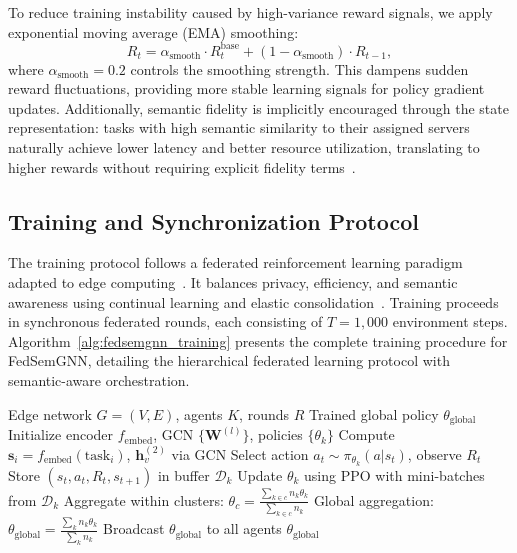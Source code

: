 \documentclass[conference]{IEEEtran}
\begin{document}
		To reduce training instability caused by high-variance reward signals, we apply exponential moving average (EMA) smoothing:
		\begin{equation}
			R_t = \alpha_{\text{smooth}} \cdot R_t^{\text{base}} + (1 - \alpha_{\text{smooth}}) \cdot R_{t-1},
			\label{eq:smoothed_reward}
		\end{equation}
		where $\alpha_{\text{smooth}} = 0.2$ controls the smoothing strength. This dampens sudden reward fluctuations, providing more stable learning signals for policy gradient updates. Additionally, semantic fidelity is implicitly encouraged through the state representation: tasks with high semantic similarity to their assigned servers naturally achieve lower latency and better resource utilization, translating to higher rewards without requiring explicit fidelity terms~\cite{ji2024resource}.
		
		\subsection{Training and Synchronization Protocol}
		
		The training protocol follows a federated reinforcement learning paradigm adapted to edge computing~\cite{grasso2022hhome, zhou2024qos}. It balances privacy, efficiency, and semantic awareness using continual learning and elastic consolidation~\cite{zhou2024robustfl}. Training proceeds in synchronous federated rounds, each consisting of $T = 1{,}000$ environment steps. Algorithm~\ref{alg:fedsemgnn_training} presents the complete training procedure for FedSemGNN, detailing the hierarchical federated learning protocol with semantic-aware orchestration.
		
		\begin{algorithm}[t]
			\caption{FedSemGNN Training Protocol}
			\label{alg:fedsemgnn_training}
			\begin{algorithmic}[1]
				\REQUIRE Edge network $G=(V,E)$, agents $K$, rounds $R$
				\ENSURE Trained global policy $\theta_{\text{global}}$
				\STATE Initialize encoder $f_{\text{embed}}$, GCN $\{\mathbf{W}^{(l)}\}$, policies $\{\theta_k\}$
				\STATE Compute $\mathbf{s}_i = f_{\text{embed}}(\text{task}_i)$, $\mathbf{h}_v^{(2)}$ via GCN
				\STATE Select action $a_t \sim \pi_{\theta_k}(a|s_t)$, observe $R_t$
				\STATE Store $(s_t, a_t, R_t, s_{t+1})$ in buffer $\mathcal{D}_k$
				\ENDFOR
				\STATE Update $\theta_k$ using PPO with mini-batches from $\mathcal{D}_k$
				\ENDFOR
				\STATE
				\STATE Aggregate within clusters: $\theta_c = \frac{\sum_{k \in c} n_k \theta_k}{\sum_{k \in c} n_k}$
				\ENDIF
				\STATE
				\STATE Global aggregation: $\theta_{\text{global}} = \frac{\sum_k n_k \theta_k}{\sum_k n_k}$
				\STATE Broadcast $\theta_{\text{global}}$ to all agents
				\ENDIF
				\ENDFOR
				\STATE
				\RETURN $\theta_{\text{global}}$
			\end{algorithmic}
		\end{algorithm}
		
\end{document}
